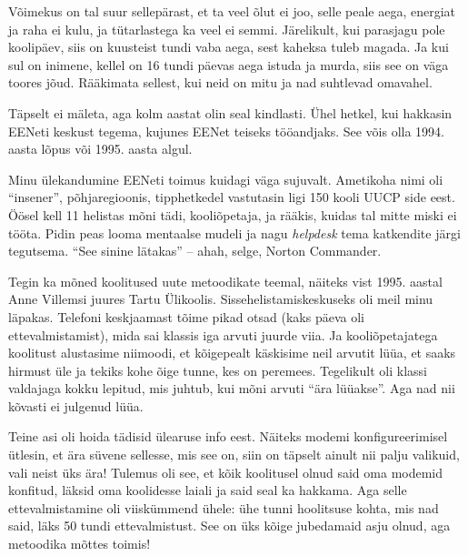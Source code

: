 
Võimekus on tal suur sellepärast, et ta veel õlut ei joo, selle peale aega, 
energiat ja raha ei kulu, ja tütarlastega ka veel ei semmi. Järelikult, kui parasjagu pole koolipäev, siis on kuusteist tundi vaba aega, 
sest kaheksa tuleb magada. Ja kui sul on inimene, kellel on 16 tundi päevas 
aega istuda ja murda, siis see on väga toores jõud. Rääkimata sellest, kui neid on mitu ja 
nad suhtlevad omavahel.


Täpselt ei mäleta, aga kolm aastat olin seal 
kindlasti. Ühel hetkel, kui hakkasin EENeti keskust 
tegema, kujunes EENet teiseks tööandjaks. See võis olla 1994. aasta lõpus või 1995. aasta algul. 

Minu ülekandumine 
EENeti toimus kuidagi väga sujuvalt. Ametikoha nimi oli \enquote{insener}, 
põhjaregioonis, tipphetkedel vastutasin ligi 150 kooli 
UUCP side eest. Öösel kell 11 helistas mõni tädi, kooliõpetaja, ja rääkis, 
kuidas tal mitte miski ei tööta. Pidin peas looma mentaalse mudeli ja 
nagu \emph{helpdesk} tema katkendite järgi tegutsema. \enquote{See sinine lätakas} 
-- ahah, selge, Norton Commander. 

Tegin ka mõned koolitused uute metoodikate teemal, näiteks vist 1995. aastal Anne Villemsi juures 
Tartu Ülikoolis. Sissehelistamiskeskuseks oli meil minu läpakas. Telefoni keskjaamast tõime 
pikad otsad (kaks päeva oli ettevalmistamist), mida sai klassis iga arvuti 
juurde viia. Ja kooliõpetajatega koolitust alustasime niimoodi, et kõigepealt 
käskisime neil arvutit lüüa, et saaks hirmust üle ja tekiks kohe õige tunne, kes on peremees. Tegelikult oli klassi valdajaga kokku 
lepitud, mis juhtub, kui mõni arvuti \enquote{ära lüüakse}. Aga nad nii kõvasti 
ei julgenud lüüa. 

Teine asi oli hoida tädisid ülearuse info eest. Näiteks modemi konfigureerimisel 
ütlesin, et ära süvene sellesse, mis see on, siin on täpselt ainult 
nii palju valikuid, vali neist üks ära! Tulemus oli see, et kõik koolitusel olnud said oma modemid konfitud, läksid oma koolidesse laiali 
ja said seal ka hakkama. Aga selle ettevalmistamine oli viiskümmend ühele: ühe tunni 
hoolitsuse kohta, mis nad said, läks 50 tundi ettevalmistust. See on üks kõige 
jubedamaid asju olnud, aga metoodika mõttes toimis! 

